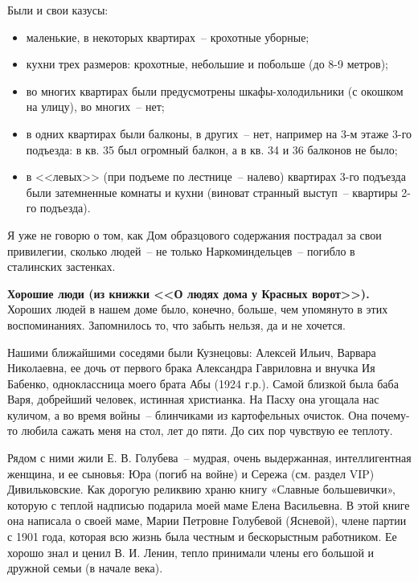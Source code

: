 Были и свои казусы:
\begin{itemize}
\item маленькие, в некоторых квартирах~-- крохотные уборные;
\item кухни трех размеров: крохотные, небольшие и побольше (до 8-9 метров);
\item во многих квартирах были предусмотрены шкафы-холодильники (с окошком на улицу), во многих~-- нет;
\item в одних квартирах были балконы, в других~-- нет, например на 3-м этаже 3-го подъезда: в кв. 35 был огромный балкон, а в кв. 34 и 36 балконов не было;
\item в <<левых>> (при подъеме по лестнице~-- налево) квартирах 3-го подъезда были затемненные комнаты и кухни (виноват странный выступ~-- квартиры 2-го подъезда). 
\end{itemize}

Я уже не говорю о том, как Дом образцового содержания пострадал за свои привилегии, сколько людей~-- не только Наркоминдельцев~-- погибло в сталинских застенках.

\newline

\textbf{Хорошие люди (из книжки <<О людях дома у Красных ворот>>).} Хороших людей в нашем доме было, конечно, больше, чем упомянуто в этих воспоминаниях. Запомнилось то, что забыть нельзя, да и не хочется.

\newline

Нашими ближайшими соседями были Кузнецовы: Алексей Ильич, Варвара Николаевна, ее дочь от первого брака Александра Гавриловна и внучка Ия Бабенко, одноклассница моего брата Абы (1924 г.р.). Самой близкой была баба Варя, добрейший человек, истинная христианка. На Пасху она угощала нас куличом, а во время войны~-- блинчиками из картофельных очисток. Она почему-то любила сажать меня на стол, лет до пяти. До сих пор чувствую ее теплоту.

\newline
Рядом с ними жили Е. В. Голубева~-- мудрая, очень выдержанная, интеллигентная женщина, и ее сыновья: Юра (погиб на войне) и Сережа (см. раздел VIP) Дивильковские. Как дорогую реликвию храню книгу «Славные большевички», которую с теплой надписью подарила моей маме Елена Васильевна. В этой книге она написала о своей маме, Марии Петровне Голубевой (Ясневой), члене партии с 1901 года, которая всю жизнь была честным и бескорыстным работником. Ее хорошо знал и ценил В. И. Ленин, тепло принимали члены его большой и дружной семьи (в начале века).

